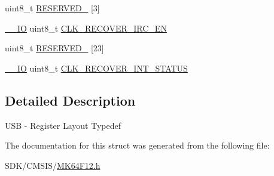\begin{DoxyCompactItemize}
\item 
uint8\+\_\+t \mbox{\hyperlink{group___v_r_e_f___peripheral___access___layer_ga0a68d7345f63f9bfd5d11ff07db64d88}{R\+E\+S\+E\+R\+V\+E\+D\+\_}} \mbox{[}3\mbox{]}
\item 
\mbox{\hyperlink{core__cm4_8h_aec43007d9998a0a0e01faede4133d6be}{\+\_\+\+\_\+\+IO}} uint8\+\_\+t \mbox{\hyperlink{group___v_r_e_f___peripheral___access___layer_ga9cd5cd20ce5d7dbf868a7af12fe69b81}{C\+L\+K\+\_\+\+R\+E\+C\+O\+V\+E\+R\+\_\+\+I\+R\+C\+\_\+\+EN}}
\item 
uint8\+\_\+t \mbox{\hyperlink{group___v_r_e_f___peripheral___access___layer_ga6678449777d6b957055fdfa2a8668db7}{R\+E\+S\+E\+R\+V\+E\+D\+\_}} \mbox{[}23\mbox{]}
\item 
\mbox{\hyperlink{core__cm4_8h_aec43007d9998a0a0e01faede4133d6be}{\+\_\+\+\_\+\+IO}} uint8\+\_\+t \mbox{\hyperlink{group___v_r_e_f___peripheral___access___layer_ga45cfec446adcac8826db39db8dfb292d}{C\+L\+K\+\_\+\+R\+E\+C\+O\+V\+E\+R\+\_\+\+I\+N\+T\+\_\+\+S\+T\+A\+T\+US}}
\end{DoxyCompactItemize}


\subsection{Detailed Description}
U\+SB -\/ Register Layout Typedef 

The documentation for this struct was generated from the following file\+:\begin{DoxyCompactItemize}
\item 
S\+D\+K/\+C\+M\+S\+I\+S/\mbox{\hyperlink{_m_k64_f12_8h}{M\+K64\+F12.\+h}}\end{DoxyCompactItemize}
